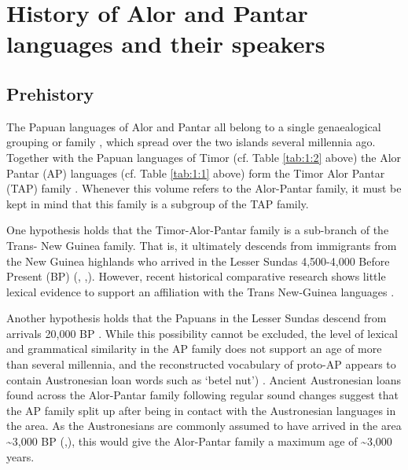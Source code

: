 \section{History of Alor and Pantar languages and their speakers}\label{sec:1:4}

\subsection{Prehistory}\label{sec:1:4.1}
The Papuan languages of Alor and Pantar all belong to a single genaealogical grouping or family \citep{HoltonEtAl2012,HoltonRobinsonTVhistory}, which spread over the two islands several millennia ago. Together with the Papuan languages of Timor (cf. Table \ref{tab:1:2} above) the Alor Pantar (AP) languages (cf. Table \ref{tab:1:1} above) form the Timor Alor Pantar (TAP) family \citep{SchapperEtAlTVtimor}. Whenever this volume refers to the Alor-Pantar family, it must be kept in mind that this family is a subgroup of the TAP family. 

One hypothesis holds that the Timor-Alor-Pantar family is a sub-branch of the Trans- New Guinea family. That is, it ultimately descends from immigrants from the New Guinea highlands who arrived in the Lesser Sundas 4,500-4,000 Before Present (BP) (\citealt[123]{Bellwood1997}, \citealt[42]{Ross2005},\citealt{Pawley2005}). However, recent historical comparative research \citep{RobinsonEtAl2012internal,HoltonRobinsonTVposition} shows little lexical evidence to support an affiliation with the Trans New-Guinea languages \citep[cf.][]{WurmEtAl1975,Ross2005}.

Another hypothesis holds that the Papuans in the Lesser Sundas descend from arrivals 20,000 BP \citep{Summerhayes2007}. While this possibility cannot be excluded, the level of lexical and grammatical similarity in the AP family does not support an age of more than several millennia, and the reconstructed vocabulary of proto-AP appears to contain Austronesian loan words such as  `betel nut') \citep{HoltonEtAl2012,Robinsontaalorpantar}. Ancient Austronesian loans found across the Alor-Pantar family following regular sound changes suggest that the AP family split up after being in contact with the Austronesian languages in the area. As the Austronesians are commonly assumed to have arrived in the area \~{}3,000 BP (\citealt[100]{Pawley2005},\citealt{Spriggs2011}), this would give the Alor-Pantar family a maximum age of \~{}3,000 years.

